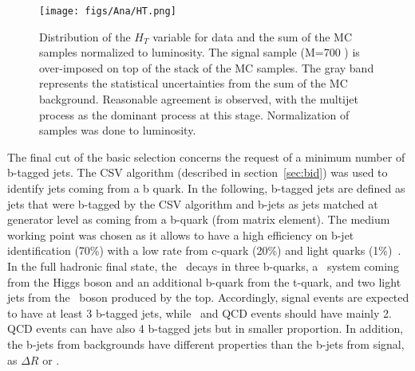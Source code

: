 \begin{figure}[!Hhtbp]
  \begin{center}
    \texttt{[image: figs/Ana/HT.png]}
    \caption{Distribution of the $H_{T}$ variable for data and the sum of the MC samples normalized to luminosity. The signal sample (M=700 \GeVcc) is over-imposed on top of the stack of the MC samples. The gray band represents the statistical uncertainties from the sum of the MC background. Reasonable agreement is observed, with the multijet process as the dominant process at this stage. Normalization of samples was done to luminosity.}
    \label{fig:HT}
  \end{center}
\end{figure}

The final cut of the basic selection concerns the request of a minimum number of b-tagged jets. The CSV algorithm (described in section~\ref{sec:bid}) was used to identify jets coming from a b quark. In the following, b-tagged jets are defined as jets that were b-tagged by the CSV algorithm and b-jets as jets matched at generator level as coming from a b-quark (from matrix element). The medium working point was chosen as it allows to have a high efficiency on b-jet identification (70\%) with a low rate from c-quark (20\%) and light quarks (1\%)~\cite{Chatrchyan:2012jua, CMS-PAS-BTV-13-001}. In the full hadronic final state, the \Tp~decays in three b-quarks, a \bbbar~system coming from the Higgs boson and an additional b-quark from the t-quark, and two light jets from the \W~boson produced by the top. Accordingly, signal events are expected to have at least 3 b-tagged jets, while \ttbar~and QCD events should have mainly 2. QCD events can have also 4 b-tagged jets but in smaller proportion. In addition, the b-jets from backgrounds have different properties than the b-jets from signal, as $\Delta R$ or \pt.


